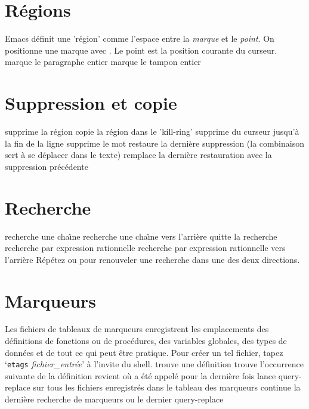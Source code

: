 \section{R\'egions}

Emacs d\'efinit une 'r\'egion' comme l'espace entre la {\it marque\/} et
le {\it point}. On positionne une marque avec .
Le point est la position courante du curseur.
\askip
{} marque le paragraphe entier
 marque le tampon entier

\section{Suppression et copie}

 supprime la r\'egion
 copie la r\'egion dans le 'kill-ring'
 supprime du curseur jusqu'\`a la fin de la ligne
 supprime le mot
 restaure la derni\`ere suppression (la combinaison  sert \`a se d\'eplacer dans le texte)
 remplace la derni\`ere restauration avec la suppression pr\'ec\'edente

\section{Recherche}

 recherche une cha\^\i{}ne
 recherche une cha\^\i{}ne vers l'arri\`ere
 quitte la recherche
 recherche par expression rationnelle
 recherche par expression rationnelle vers l'arri\`ere
\askip
R\'ep\'etez  ou  pour renouveler une recherche dans une
des deux directions.

\section{Marqueurs}

Les fichiers de tableaux de marqueurs enregistrent les emplacements des
d\'efinitions de fonctions ou de proc\'edures, des variables globales, des
types de donn\'ees et de tout ce qui peut \^etre pratique. Pour cr\'eer un
tel fichier, tapez `{\tt etags} {\it fichier\_entr\'ee}' \`a l'invite du shell.
\askip
{} trouve une d\'efinition
 trouve l'occurrence suivante de la d\'efinition
 revient o\`u  a \'et\'e appel\'e pour la derni\`ere fois
 lance query-replace sur tous les
fichiers enregistr\'es dans le tableau des marqueurs
 continue la derni\`ere recherche de marqueurs ou le dernier
query-replace


